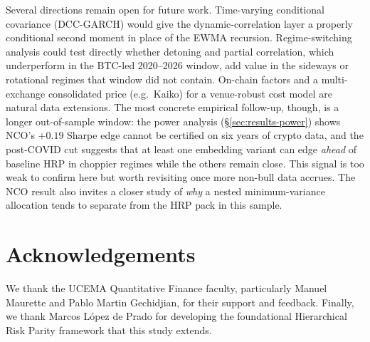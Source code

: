 \documentclass[11pt,a4paper]{article}
\begin{document}
Several directions remain open for future work. Time-varying
conditional covariance (DCC-GARCH) would give the dynamic-correlation
layer a properly
conditional second moment in place of the EWMA recursion.
Regime-switching analysis could test directly whether detoning and
partial correlation, which underperform in the BTC-led 2020--2026
window, add value in the sideways or rotational regimes that window
did not contain. On-chain factors \citep{liu2022cryptofactors} and a
multi-exchange consolidated price (e.g.\ Kaiko) for a venue-robust cost
model are natural data extensions. The most concrete empirical
follow-up, though, is a longer out-of-sample window: the power analysis
(\S\ref{sec:results-power}) shows NCO's $+0.19$ Sharpe edge cannot be
certified on six years of crypto data, and the post-COVID cut suggests
that at least one embedding variant can edge \emph{ahead} of baseline
HRP in choppier regimes while the others remain close. This signal is too weak to confirm here but
worth revisiting once more non-bull data accrues. The NCO result also
invites a closer study of \emph{why} a nested minimum-variance
allocation tends to separate from the HRP pack in this sample.

\section*{Acknowledgements}

We thank the UCEMA
Quantitative Finance faculty, particularly Manuel Maurette and Pablo
Martin Gechidjian, for their support and feedback. Finally, we thank
Marcos L\'opez de Prado for developing the foundational Hierarchical
Risk Parity framework that this study extends.



\end{document}
